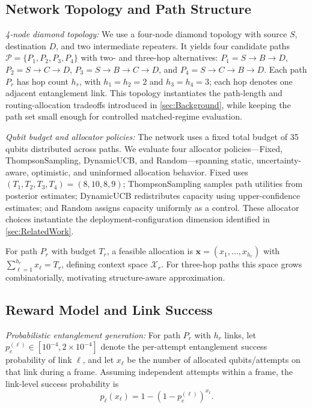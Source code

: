 \documentclass[10pt,conference]{IEEEtran}
\newcommand{\smallTitle}[1]{\vspace{1mm}\noindent\textit{#1:}}
\begin{document}
\subsection{Network Topology and Path Structure}
\label{subsec:topology}

\smallTitle{4-node diamond topology}
We use a four-node diamond topology with source $S$, destination $D$, and two intermediate repeaters. It yields four candidate paths $\mathcal{P}=\{P_1,P_2,P_3,P_4\}$ with two- and three-hop alternatives: $P_1=S{\to}B{\to}D$, $P_2=S{\to}C{\to}D$, $P_3=S{\to}B{\to}C{\to}D$, and $P_4=S{\to}C{\to}B{\to}D$. Each path $P_r$ has hop count $h_r$, with $h_1=h_2=2$ and $h_3=h_4=3$; each hop denotes one adjacent entanglement link. This topology instantiates the path-length and routing-allocation tradeoffs introduced in \cref{sec:Background}, while keeping the path set small enough for controlled matched-regime evaluation.

\smallTitle{Qubit budget and allocator policies}
The network uses a fixed total budget of 35 qubits distributed across paths. We evaluate four allocator policies---Fixed, ThompsonSampling, DynamicUCB, and Random---spanning static, uncertainty-aware, optimistic, and uninformed allocation behavior. Fixed uses $(T_1,T_2,T_3,T_4)=(8,10,8,9)$; ThompsonSampling samples path utilities from posterior estimates; DynamicUCB redistributes capacity using upper-confidence estimates; and Random assigns capacity uniformly as a control. These allocator choices instantiate the deployment-configuration dimension identified in \cref{sec:RelatedWork}.

For path $P_r$ with budget $T_r$, a feasible allocation is $\mathbf{x}=(x_1,\ldots,x_{h_r})$ with $\sum_{\ell=1}^{h_r}x_\ell=T_r$, defining context space $\mathcal{X}_r$. For three-hop paths this space grows combinatorially, motivating structure-aware approximation.

\subsection{Reward Model and Link Success}
\label{subsec:reward}

\smallTitle{Probabilistic entanglement generation}
For path $P_r$ with $h_r$ links, let $p_e^{(\ell)}\in[10^{-4},2{\times}10^{-4}]$ denote the per-attempt entanglement success probability of link $\ell$, and let $x_\ell$ be the number of allocated qubits/attempts on that link during a frame. Assuming independent attempts within a frame, the link-level success probability is
\[
p_\ell(x_\ell)=1-(1-p_e^{(\ell)})^{x_\ell}.
\]
\end{document}
